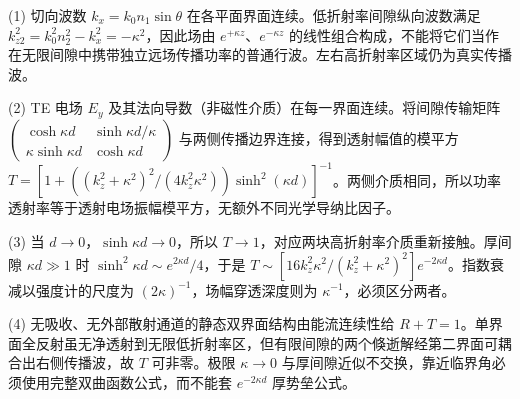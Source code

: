 (1) 切向波数 \(k_x=k_0n_1\sin\theta\) 在各平面界面连续。低折射率间隙纵向波数满足 \(k_{z2}^2=k_0^2n_2^2-k_x^2=-\kappa^2\)，因此场由 \(e^{+\kappa z}\)、\(e^{-\kappa z}\) 的线性组合构成，不能将它们当作在无限间隙中携带独立远场传播功率的普通行波。左右高折射率区域仍为真实传播波。

(2) TE 电场 \(E_y\) 及其法向导数（非磁性介质）在每一界面连续。将间隙传输矩阵 \(\begin{pmatrix}\cosh\kappa d&\sinh\kappa d/\kappa\\\kappa\sinh\kappa d&\cosh\kappa d\end{pmatrix}\) 与两侧传播边界连接，得到透射幅值的模平方 \(T=[1+((k_z^2+\kappa^2)^2/(4k_z^2\kappa^2))\sinh^2(\kappa d)]^{-1}\)。两侧介质相同，所以功率透射率等于透射电场振幅模平方，无额外不同光学导纳比因子。

(3) 当 \(d\to0\)，\(\sinh\kappa d\to0\)，所以 \(T\to1\)，对应两块高折射率介质重新接触。厚间隙 \(\kappa d\gg1\) 时 \(\sinh^2\kappa d\sim e^{2\kappa d}/4\)，于是 \(T\sim[16k_z^2\kappa^2/(k_z^2+\kappa^2)^2]e^{-2\kappa d}\)。指数衰减以强度计的尺度为 \((2\kappa)^{-1}\)，场幅穿透深度则为 \(\kappa^{-1}\)，必须区分两者。

(4) 无吸收、无外部散射通道的静态双界面结构由能流连续性给 \(R+T=1\)。单界面全反射虽无净透射到无限低折射率区，但有限间隙的两个倏逝解经第二界面可耦合出右侧传播波，故 \(T\) 可非零。极限 \(\kappa\to0\) 与厚间隙近似不交换，靠近临界角必须使用完整双曲函数公式，而不能套 \(e^{-2\kappa d}\) 厚势垒公式。
